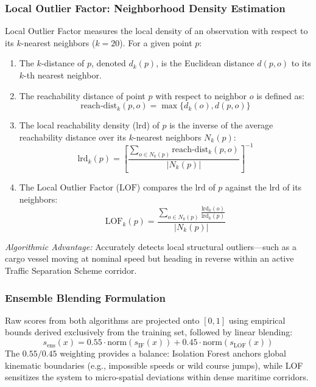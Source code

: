 \subsubsection{Local Outlier Factor: Neighborhood Density Estimation}
Local Outlier Factor measures the local density of an observation with respect to its $k$-nearest neighbors ($k=20$). For a given point $p$:
\begin{enumerate}[leftmargin=*]
    \item The $k$-distance of $p$, denoted $d_k(p)$, is the Euclidean distance $d(p, o)$ to its $k$-th nearest neighbor.
    \item The reachability distance of point $p$ with respect to neighbor $o$ is defined as:
    \begin{equation}
    \text{reach-dist}_k(p, o) = \max\{d_k(o), d(p, o)\}
    \end{equation}
    \item The local reachability density ($\text{lrd}$) of $p$ is the inverse of the average reachability distance over its $k$-nearest neighbors $N_k(p)$:
    \begin{equation}
    \text{lrd}_k(p) = \left[ \frac{\sum_{o \in N_k(p)} \text{reach-dist}_k(p, o)}{|N_k(p)|} \right]^{-1}
    \end{equation}
    \item The Local Outlier Factor ($\text{LOF}$) compares the $\text{lrd}$ of $p$ against the $\text{lrd}$ of its neighbors:
    \begin{equation}
    \text{LOF}_k(p) = \frac{\sum_{o \in N_k(p)} \frac{\text{lrd}_k(o)}{\text{lrd}_k(p)}}{|N_k(p)|}
    \end{equation}
\end{enumerate}
\textit{Algorithmic Advantage:} Accurately detects local structural outliers—such as a cargo vessel moving at nominal speed but heading in reverse within an active Traffic Separation Scheme corridor.

\subsubsection{Ensemble Blending Formulation}
Raw scores from both algorithms are projected onto $[0, 1]$ using empirical bounds derived exclusively from the training set, followed by linear blending:
\begin{equation}
s_{\text{ens}}(x) = 0.55 \cdot \text{norm}(s_{\text{IF}}(x)) + 0.45 \cdot \text{norm}(s_{\text{LOF}}(x))
\end{equation}
The $0.55 / 0.45$ weighting provides a balance: Isolation Forest anchors global kinematic boundaries (e.g., impossible speeds or wild course jumps), while LOF sensitizes the system to micro-spatial deviations within dense maritime corridors.

